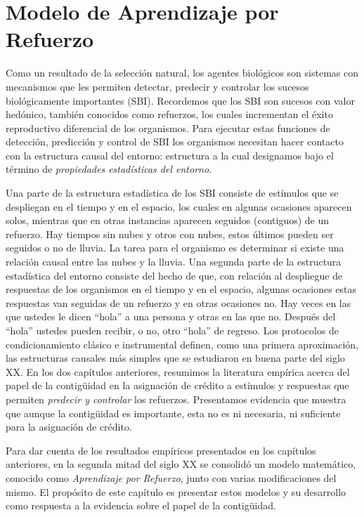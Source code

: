 \documentclass[
  letterpaper,
]{book}
\begin{document}

\chapter{Modelo de Aprendizaje por
Refuerzo}\label{modelo-de-aprendizaje-por-refuerzo}

Como un resultado de la selección natural, los agentes biológicos son
sistemas con mecanismos que les permiten detectar, predecir y controlar
los sucesos biológicamente importantes (SBI). Recordemos que los SBI son
sucesos con valor hedónico, también conocidos como refuerzos, los cuales
incrementan el éxito reproductivo diferencial de los organismos. Para
ejecutar estas funciones de detección, predicción y control de SBI los
organismos necesitan hacer contacto con la estructura causal del
entorno: estructura a la cual designamos bajo el término de
\emph{propiedades estadísticas del entorno}.

Una parte de la estructura estadística de los SBI consiste de estímulos
que se despliegan en el tiempo y en el espacio, los cuales en algunas
ocasiones aparecen solos, mientras que en otras instancias aparecen
seguidos (contiguos) de un refuerzo. Hay tiempos sin nubes y otros con
nubes, estos últimos pueden ser seguidos o no de lluvia. La tarea para
el organismo es determinar si existe una relación causal entre las nubes
y la lluvia. Una segunda parte de la estructura estadística del entorno
consiste del hecho de que, con relación al despliegue de respuestas de
los organismos en el tiempo y en el espacio, algunas ocasiones estas
respuestas van seguidas de un refuerzo y en otras ocasiones no. Hay
veces en las que ustedes le dicen ``hola'' a una persona y otras en las
que no. Después del ``hola'' ustedes pueden recibir, o no, otro ``hola''
de regreso. Los protocolos de condicionamiento clásico e instrumental
definen, como una primera aproximación, las estructuras causales más
simples que se estudiaron en buena parte del siglo XX. En los dos
capítulos anteriores, resumimos la literatura empírica acerca del papel
de la contigüidad en la asignación de crédito a estímulos y respuestas
que permiten \emph{predecir y controlar} los refuerzos. Presentamos
evidencia que muestra que aunque la contigüidad es importante, esta no
es ni necesaria, ni suficiente para la asignación de crédito.

Para dar cuenta de los resultados empíricos presentados en los capítulos
anteriores, en la segunda mitad del siglo XX se consolidó un modelo
matemático, conocido como \emph{Aprendizaje por Refuerzo}, junto con
varias modificaciones del mismo. El propósito de este capítulo es
presentar estos modelos y su desarrollo como respuesta a la evidencia
sobre el papel de la contigüidad.
\end{document}
